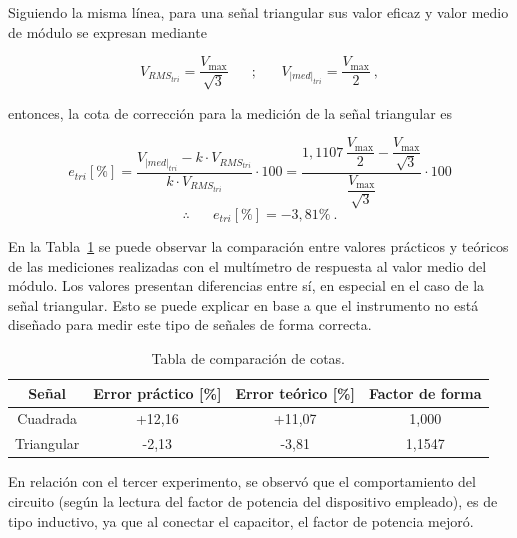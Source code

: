     Siguiendo la misma línea, para una señal triangular sus valor eficaz y valor
    medio de módulo se expresan mediante

    \vspace{-5pt}
$$ V_{RMS_{tri}} = \dfrac{V_{\max}}{\sqrt{3}} \hspace{20pt} ; \hspace{20pt} V_{|med|_{tri}} = \dfrac{V_{\max}}{2}~, $$

    \noindent entonces, la cota de corrección para la medición de 
    la señal triangular es

    \vspace{-5pt}
    $$ e_{tri} [\%] = \dfrac{V_{|med|_{tri}} - k\cdot V_{RMS_{tri}}}{k \cdot V_{RMS_{tri}}} \cdot 100
    = \dfrac{ 1,1107\, \dfrac{V_{\max}}{2} - \dfrac{V_{\max}}{\sqrt{3}} }{\dfrac{V_{\max}}{\sqrt{3}}} \cdot 100 $$
              $$  \therefore \hspace{20pt} \boxed{e_{tri}[\%] = -3,81\%}~.
    $$

    En la Tabla~\ref{tab:ComparacionCotas} se puede observar la comparación entre valores
    prácticos y teóricos de las mediciones realizadas con el multímetro de respuesta al 
    valor medio del módulo. Los valores presentan diferencias entre sí, en especial
    en el caso de la señal triangular. Esto se puede explicar en base a que el
    instrumento no está diseñado para medir este tipo de señales de forma correcta. 

    \begin{table}[H] \centering
      \begin{tabular}{|c|c|c|c|} \hline
        \textbf{Señal}       & \textbf{Error práctico [\%]}  & \textbf{Error teórico [\%]} & \textbf{Factor de forma} \\ \hline
        Cuadrada    & +12,16               & +11,07              &  1,000              \\ \hline
        Triangular  & -2,13                & -3,81              &  1,1547         \\ \hline
      \end{tabular}
      \caption{Tabla de comparación de cotas.}
      \label{tab:ComparacionCotas}
    \end{table}

En relación con el tercer experimento, se observó que el comportamiento del 
circuito (según la lectura del factor de potencia del dispositivo empleado), 
es de tipo inductivo, ya que al conectar el capacitor, el factor de potencia 
mejoró.

